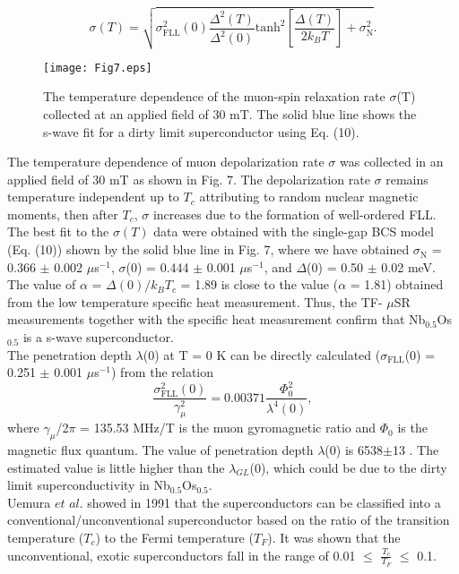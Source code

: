 \documentclass[reprint, superscriptaddress, secnumarabic, amssymb, nobibnotes, aps, prl]{revtex4-1}
\begin{document}
\begin{equation}
\sigma(T) = \sqrt{\sigma_{\mathrm{FLL}}^{2}(0)\frac{\Delta^{2}(T)}{\Delta^{2}(0)}\mathrm{tanh}^{2}\left[\frac{\Delta(T)}{2k_{B}T}\right]+\sigma_{\mathrm{N}}^{2}}  .
\label{eqn10:fs}
\end{equation}
 
\begin{figure}
\texttt{[image: Fig7.eps]}
\caption{\label{Fig7:swave} The temperature dependence of the muon-spin relaxation rate $\sigma$(T) collected at an applied field of 30 mT. The solid blue line shows the s-wave fit for a dirty limit superconductor using Eq. (10).}
\end{figure}

The temperature dependence of muon depolarization rate $\sigma$ was collected in an applied field of 30 mT as shown in Fig. 7. The depolarization rate $\sigma$ remains temperature independent up to $T_{c}$ attributing to random nuclear magnetic moments, then after $T_{c}$, $\sigma$ increases due to the formation of well-ordered FLL. The best fit to the $\sigma(T)$ data were obtained with the single-gap BCS model (Eq. (10)) shown by the solid blue line in Fig. 7, where we have obtained $\sigma_{\mathrm{N}}$ = 0.366 $\pm$ 0.002 $\mu$s$^{-1}$, $\sigma$(0) = 0.444 $\pm$ 0.001 $\mu$s$^{-1}$, and $\Delta$(0) = 0.50 $\pm$ 0.02 meV. The value of $\alpha$ = $\Delta(0)/k_{B}T_{c}$ = 1.89 is close to the value ($\alpha$ = 1.81) obtained from the low temperature specific heat measurement. Thus, the TF- $\mu$SR measurements together with the specific heat measurement confirm that Nb$_{0.5}$Os$_{0.5}$ is a s-wave superconductor.\\
The penetration depth $\lambda$(0) at T = 0 K can be directly calculated ($\sigma_{\mathrm{FLL}}$(0) = 0.251 $\pm$ 0.001 $\mu$s$^{-1}$) from the relation \cite{JES,EHB}
\begin{equation}
\frac{\sigma_{\mathrm{FLL}}^2(0)}{\gamma_{\mu}^2} = 0.00371 \frac{\Phi_{0}^{2}}{\lambda^{4}(0)} ,
\label{eqn11:lam}
\end{equation} 
where $\gamma_{\mu}$/2$\pi$ = 135.53 MHz/T is the muon gyromagnetic ratio and $\Phi_{0}$ is the magnetic flux quantum. The value of penetration depth $\lambda$(0) is 6538$\pm$13 \text{\AA}. The estimated value is little higher than the $\lambda_{GL}$(0), which could be due to the dirty limit superconductivity in Nb$_{0.5}$Os$_{0.5}$.\\
Uemura $\textit{et al.}$ showed in 1991 that the superconductors can be classified into a conventional/unconventional superconductor \cite{KK,YJU} based on the ratio of the transition temperature ($T_{c}$) to the Fermi temperature ($T_{F}$). It was shown that the unconventional, exotic superconductors fall in the range of 0.01 $\leq$ $\frac{T_{c}}{T_{F}}$ $\leq$ 0.1.
\end{document}
